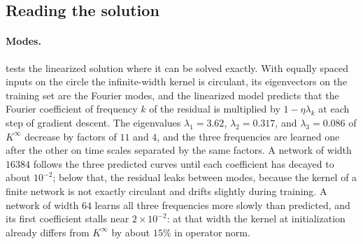 \begin{refsection}
\section{Reading the solution}\label{sec:lazy:reading}

\paragraph{Modes.}  tests the linearized solution where it can be solved exactly. With equally spaced inputs on the circle the infinite-width kernel is circulant, its eigenvectors on the training set are the Fourier modes, and the linearized model predicts that the Fourier coefficient of frequency $k$ of the residual is multiplied by $1-\eta\lambda_k$ at each step of gradient descent. The eigenvalues $\lambda_1=3.62$, $\lambda_2=0.317$, and $\lambda_3=0.086$ of $K^\infty$ decrease by factors of $11$ and $4$, and the three frequencies are learned one after the other on time scales separated by the same factors. A network of width $16384$ follows the three predicted curves until each coefficient has decayed to about $10^{-2}$; below that, the residual leaks between modes, because the kernel of a finite network is not exactly circulant and drifts slightly during training. A network of width $64$ learns all three frequencies more slowly than predicted, and its first coefficient stalls near $2\times10^{-2}$: at that width the kernel at initialization already differs from $K^\infty$ by about $15\%$ in operator norm.


\end{refsection}
